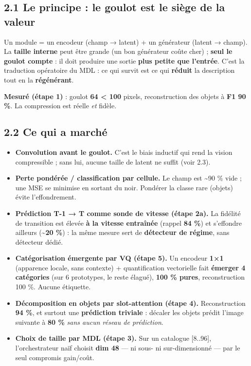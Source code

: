 \documentclass[
  french,
  11pt,
]{article}
\providecommand{\tightlist}{%
  \setlength{\itemsep}{0pt}\setlength{\parskip}{0pt}}
\begin{document}
\subsection{2.1 Le principe : le goulot est le siège de la
valeur}\label{le-principe-le-goulot-est-le-siuxe8ge-de-la-valeur}

Un module = un encodeur (champ → latent) + un générateur (latent →
champ). La \textbf{taille interne} peut être grande (un bon générateur
coûte cher) ; \textbf{seul le goulot compte} : il doit produire une
sortie \textbf{plus petite que l'entrée}. C'est la traduction opératoire
du MDL : ce qui survit est ce qui \textbf{réduit} la description tout en
la \textbf{régénérant}.

\textbf{Mesuré (étape 1)} : goulot \textbf{64 \textless{} 100} pixels,
reconstruction des objets à \textbf{F1 90 \%}. La compression est réelle
\emph{et} fidèle.

\subsection{2.2 Ce qui a marché}\label{ce-qui-a-marchuxe9}

\begin{itemize}
\tightlist
\item
  \textbf{Convolution avant le goulot.} C'est le biais inductif qui rend
  la vision compressible ; sans lui, aucune taille de latent ne suffit
  (voir 2.3).
\item
  \textbf{Perte pondérée / classification par cellule.} Le champ est
  \textasciitilde90 \% vide ; une MSE se minimise en sortant du noir.
  Pondérer la classe rare (objets) évite l'effondrement.
\item
  \textbf{Prédiction T-1 → T comme sonde de vitesse (étape 2a).} La
  fidélité de transition est élevée \textbf{à la vitesse entraînée}
  (rappel \textbf{84 \%}) et s'effondre ailleurs
  (\textbf{\textasciitilde20 \%}) : la même mesure sert de
  \textbf{détecteur de régime}, sans détecteur dédié.
\item
  \textbf{Catégorisation émergente par VQ (étape 5).} Un encodeur
  \textbf{1×1} (apparence locale, sans contexte) + quantification
  vectorielle fait \textbf{émerger 4 catégories} (sur 6 prototypes, le
  reste élagué), \textbf{100 \% pures}, reconstruction 100 \%. Aucune
  étiquette.
\item
  \textbf{Décomposition en objets par slot-attention (étape 4).}
  Reconstruction \textbf{94 \%}, et surtout une \textbf{prédiction
  triviale} : décaler les objets prédit l'image suivante à \textbf{80
  \%} \emph{sans aucun réseau de prédiction}.
\item
  \textbf{Choix de taille par MDL (étape 3).} Sur un catalogue
  {[}8..96{]}, l'orchestrateur naïf choisit \textbf{dim 48} --- ni sous-
  ni sur-dimensionné --- par le seul compromis gain/coût.
\end{itemize}
\end{document}
